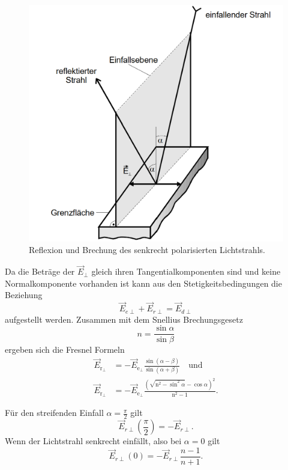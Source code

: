 \begin{figure}[H]
	\centering
	\includegraphics[width=0.6\linewidth]{content/grafik/bild1.png}
	\caption{Reflexion und Brechung des senkrecht polarisierten Lichtstrahls. \cite{fresnel}}
	\label{fig:bild1}
\end{figure}

Da die Beträge der $\vec{E}_{\perp}$ gleich ihren Tangentialkomponenten sind und keine Normalkomponente vorhanden ist kann aus den
Stetigkeitsbedingungen die Beziehung 
\begin{equation*}
    \vec{E}_{e\perp} + \vec{E}_{r \perp} = \vec{E}_{d\perp}
\end{equation*}
aufgestellt werden.  
Zusammen mit dem Snellius Brechungsgesetz
\begin{equation}
    n = \frac{\sin \alpha}{\sin \beta}
    \label{eqn:snellius}
\end{equation}
ergeben sich die Fresnel Formeln
\begin{equation}
    \begin{aligned}
    \vec{E}_{\mathrm{r}_{\perp}}&=-\vec{E}_{\mathrm{e}_{\perp}} \frac{\sin (\alpha-\beta)}{\sin (\alpha+\beta)} \quad \text{und}\\
    \vec{E}_{\mathrm{r}_{\perp}}&=-\vec{E}_{\mathrm{e}_{\perp}} \frac{\left(\sqrt{\mathrm{n}^2-\sin ^2 \alpha}-\cos \alpha\right)^2}{\mathrm{n}^2-1} .
    \label{eqn:fresnel1}
    \end{aligned}
\end{equation}

Für den streifenden Einfall $\alpha = \frac{\pi}{2}$ gilt
\begin{equation*}
    \vec{E}_{r\perp}(\frac{\pi}{2}) = - \vec{E}_{r\perp}.
\end{equation*}
Wenn der Lichtstrahl senkrecht einfällt, also bei $\alpha = 0$ gilt
\begin{equation*}
    \vec{E}_{r\perp}(0) = - \vec{E}_{r\perp}\frac{n - 1}{n + 1}.
\end{equation*}


